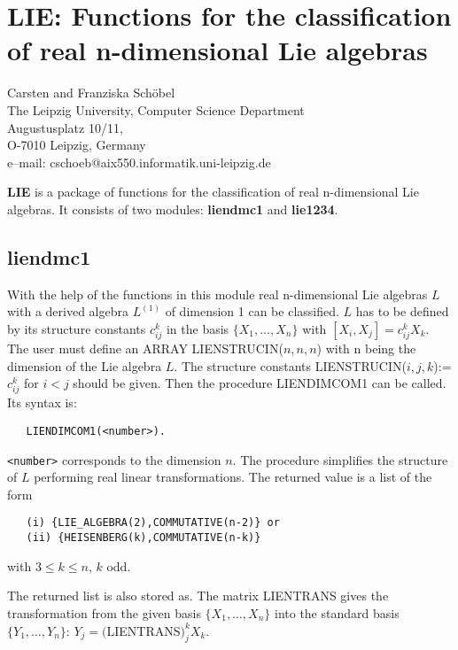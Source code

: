 \chapter[LIE: Classification of Lie algebras]%
 {LIE: Functions for the classification of real n-dimensional Lie algebras}
\label{LIE}

{\footnotesize
\begin{center}
Carsten and Franziska Sch\"obel\\
The Leipzig University,  Computer Science Department \\
Augustusplatz 10/11, \\
O-7010 Leipzig, Germany \\[0.05in]
e--mail: cschoeb@aix550.informatik.uni-leipzig.de
\end{center}
}

{\bf LIE} is a package of functions for the classification of real
n-dimensional Lie algebras. It consists of two modules: {\bf liendmc1}
and {\bf lie1234}.

\section{liendmc1}

With the help of the functions in this module real n-dimensional Lie
algebras $L$ with a derived algebra $L^{(1)}$ of dimension 1 can be
classified.  $L$ has to be defined by its structure constants
 $c_{ij}^k$ in the basis $\{X_1,\ldots,X_n\}$ with
 $[X_i,X_j]=c_{ij}^k X_k$.  The user must define an ARRAY
LIENSTRUCIN($n,n,n$) with n being
the dimension of the Lie algebra $L$.  The structure constants
LIENSTRUCIN($i,j,k$):=$c_{ij}^k$ for $i<j$ should be given. Then the
procedure LIENDIMCOM1 can be called. Its syntax is:
\begin{verbatim}
   LIENDIMCOM1(<number>).
\end{verbatim}
{\tt <number>} corresponds to the dimension $n$.  The procedure simplifies
the structure of $L$ performing real linear transformations.  The returned
value is a list of the form
\begin{verbatim}
   (i) {LIE_ALGEBRA(2),COMMUTATIVE(n-2)} or
   (ii) {HEISENBERG(k),COMMUTATIVE(n-k)}
\end{verbatim}
with $3\leq k\leq n$, $k$ odd.

The returned list is also stored as. The matrix LIENTRANS gives the transformation from the
given basis $\{X_1,\ldots ,X_n\}$ into the standard basis
$\{Y_1,\ldots ,Y_n\}$: $Y_j=($LIENTRANS$)_j^k X_k$.

